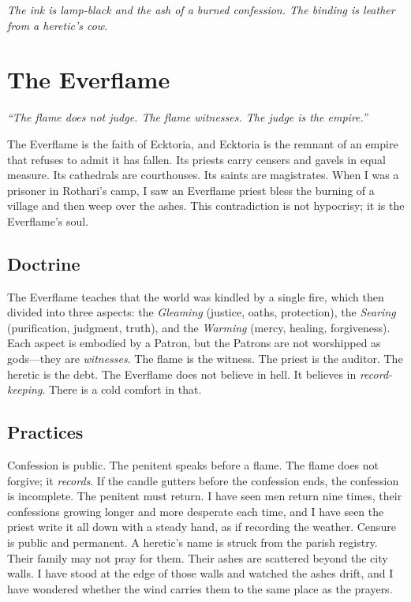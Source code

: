 \documentclass{book}
\newcommand{\citation}[1]{\textcolor{marginalia}{\small\textit{#1}}}
\begin{document}
\vspace{1em}

\noindent \citation{The ink is lamp-black and the ash of a burned confession. The binding is leather from a heretic's cow.}


\section{The Everflame}

\textit{``The flame does not judge. The flame witnesses. The judge is the empire.''}

The Everflame is the faith of Ecktoria, and Ecktoria is the remnant of an empire that refuses to admit it has fallen. Its priests carry censers and gavels in equal measure. Its cathedrals are courthouses. Its saints are magistrates. When I was a prisoner in Rothari's camp, I saw an Everflame priest bless the burning of a village and then weep over the ashes. This contradiction is not hypocrisy; it is the Everflame's soul.

\subsection{Doctrine}

The Everflame teaches that the world was kindled by a single fire, which then divided into three aspects: the \textit{Gleaming} (justice, oaths, protection), the \textit{Searing} (purification, judgment, truth), and the \textit{Warming} (mercy, healing, forgiveness). Each aspect is embodied by a Patron, but the Patrons are not worshipped as gods---they are \textit{witnesses}. The flame is the witness. The priest is the auditor. The heretic is the debt. The Everflame does not believe in hell. It believes in \textit{record-keeping}. There is a cold comfort in that.

\subsection{Practices}

Confession is public. The penitent speaks before a flame. The flame does not forgive; it \textit{records}. If the candle gutters before the confession ends, the confession is incomplete. The penitent must return. I have seen men return nine times, their confessions growing longer and more desperate each time, and I have seen the priest write it all down with a steady hand, as if recording the weather. Censure is public and permanent. A heretic's name is struck from the parish registry. Their family may not pray for them. Their ashes are scattered beyond the city walls. I have stood at the edge of those walls and watched the ashes drift, and I have wondered whether the wind carries them to the same place as the prayers.
\end{document}
